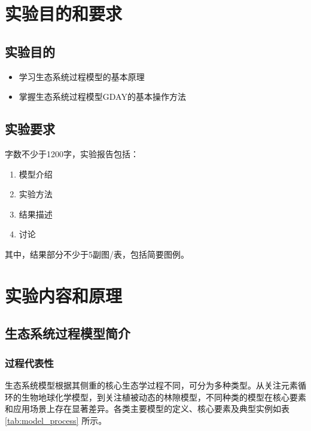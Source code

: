 \documentclass[10pt]{config}
\date{2025.12.17}
\begin{document}
\makeheader %


\section{实验目的和要求}

\subsection{实验目的}

\begin{itemize}
    \item 学习生态系统过程模型的基本原理
    \item 掌握生态系统过程模型GDAY的基本操作方法
\end{itemize}

\subsection{实验要求}

字数不少于1200字，实验报告包括：

\begin{enumerate}
    \item 模型介绍
    \item 实验方法 
    \item 结果描述
    \item 讨论
\end{enumerate}

其中，结果部分不少于5副图/表，包括简要图例。

\newpage

\section{实验内容和原理}

\subsection{生态系统过程模型简介}

\subsubsection{过程代表性}

生态系统模型根据其侧重的核心生态学过程不同，可分为多种类型。从关注元素循环的生物地球化学模型，到关注植被动态的林隙模型，不同种类的模型在核心要素和应用场景上存在显著差异。各类主要模型的定义、核心要素及典型实例如表 \ref{tab:model_process} 所示。
\end{document}
